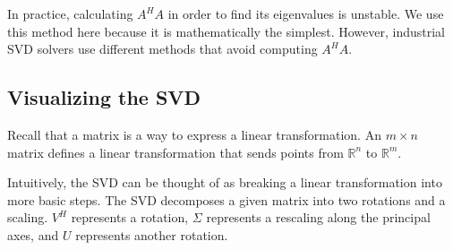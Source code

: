 \begin{info}
In practice, calculating $A^HA$ in order to find its eigenvalues is unstable.
We use this method here because it is mathematically the simplest.
However, industrial SVD solvers use different methods that avoid computing $A^HA$.
\end{info}

\subsection*{Visualizing the SVD}
Recall that a matrix is a way to express a linear transformation.
An $m\times n$ matrix defines a linear transformation that sends points from $\mathbb{R}^n$ to $\mathbb{R}^m$.

Intuitively, the SVD can be thought of as breaking a linear transformation into more basic steps.
The SVD decomposes a given matrix into two rotations and a scaling.
$V^H$ represents a rotation, $\Sigma$ represents a rescaling along the principal axes, and $U$ represents another rotation.


